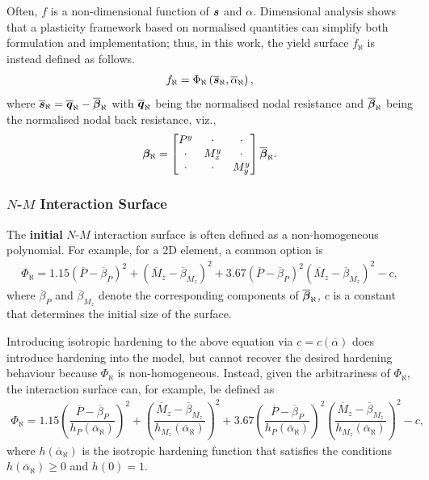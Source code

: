 Often, $f$ is a non-dimensional function of $\bm{s}$ and $\alpha$.
Dimensional analysis shows that a plasticity framework based on normalised quantities can simplify both formulation and implementation; thus, in this work, the yield surface $f_\aleph$ is instead defined as follows.
\begin{gather}
f_\aleph=\Phi_\aleph\left(\bm{\overline{s}}_\aleph,\overline{\alpha}_\aleph\right),
\end{gather}
where $\bm{\overline{s}}_\aleph=\bm{\overline{q}}_\aleph-\overline{\bm{\beta}}_\aleph$ with $\bm{\overline{q}}_\aleph$ being the normalised nodal resistance  and $\overline{\bm{\beta}}_\aleph$ being the normalised nodal back resistance, viz.,
\begin{gather}
\bm{\beta}_\aleph=\begin{bmatrix}
P^y&\cdot&\cdot\\\cdot&M_z^y&\cdot\\\cdot&\cdot&M_y^y
\end{bmatrix}\overline{\bm{\beta}}_\aleph.
\end{gather}
\subsubsection{\texorpdfstring{$N$-$M$}{N-M} Interaction Surface}
The \textbf{initial} $N$-$M$ interaction surface is often defined as a non-homogeneous polynomial.
For example, for a 2D element, a common option is
\begin{gather}
\Phi_\aleph=1.15\left(\overline{P}-\overline{\beta}_P\right)^2+\left(\overline{M}_z-\overline{\beta}_{M_z}\right)^2+3.67\left(\overline{P}-\overline{\beta}_P\right)^2\left(\overline{M}_z-\overline{\beta}_{M_z}\right)^2-c,
\end{gather}
where $\overline{\beta}_P$ and $\overline{\beta}_{M_z}$ denote the corresponding components of $\overline{\bm{\beta}}_\aleph$, $c$ is a constant that determines the initial size of the surface.

Introducing isotropic hardening to the above equation via $c=c\left(\overline{\alpha}\right)$ does introduce hardening into the model, but cannot recover the desired hardening behaviour because $\Phi_\aleph$ is non-homogeneous.
Instead, given the arbitrariness of $\Phi_\aleph$, the interaction surface can, for example, be defined as
\begin{gather}\label{eq:nm_surface_used}
\Phi_\aleph=
1.15\left(\dfrac{\overline{P}-\overline{\beta}_P}{h_P\left(\overline{\alpha}_\aleph\right)}\right)^2+
\left(\dfrac{\overline{M}_z-\overline{\beta}_{M_z}}{h_{M_z}\left(\overline{\alpha}_\aleph\right)}\right)^2+
3.67\left(\dfrac{\overline{P}-\overline{\beta}_P}{h_P\left(\overline{\alpha}_\aleph\right)}\right)^2\left(\dfrac{\overline{M}_z-\overline{\beta}_{M_z}}{h_{M_z}\left(\overline{\alpha}_\aleph\right)}\right)^2-c,
\end{gather}
where $h\left(\overline{\alpha}_\aleph\right)$ is the isotropic hardening function that satisfies the conditions $h\left(\overline{\alpha}_\aleph\right)\geqslant0$ and $h\left(0\right)=1$.

